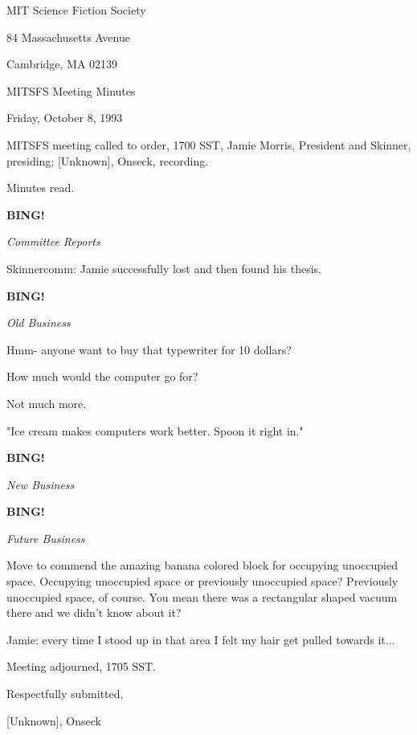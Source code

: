 \documentclass[12pt]{article}
\newcommand{\bing}{{\bf BING!} }
\newcommand{\goto}[1]{\bing \vskip 12pt \centerline{{\em{#1}}}}
\begin{document}
\begin{center}

MIT Science Fiction Society 

84 Massachusetts Avenue

Cambridge, MA 02139

\vspace{12pt}

MITSFS Meeting Minutes 

Friday, October 8, 1993

\end{center}
 
\vspace{18pt}

\setlength{\parskip}{6pt}

\noindent
MITSFS meeting called to order, 1700 SST,
Jamie Morris, President and Skinner, presiding; [Unknown], Onseck, recording.

Minutes read.

\goto{Committee Reports}

Skinnercomm: Jamie successfully lost and then found his thesis.

\goto{Old Business}

Hmm- anyone want to buy that typewriter for 10 dollars?

How much would the computer go for?

Not much more.

"Ice cream makes computers work better. Spoon it right in."

\goto{New Business}

\goto{Future Business}

Move to commend the amazing banana colored block for occupying unoccupied space. Occupying unoccupied space or previously unoccupied space? Previously unoccupied space, of course. You mean there was a rectangular shaped vacuum there and we didn't know about it?

Jamie: every time I stood up in that area I felt my hair get pulled towards it...

\vspace{12pt}

\noindent
Meeting adjourned, 1705 SST.

\vspace{18pt}

\centerline{Respectfully submitted,}
\centerline{[Unknown], Onseck}
\end{document}
